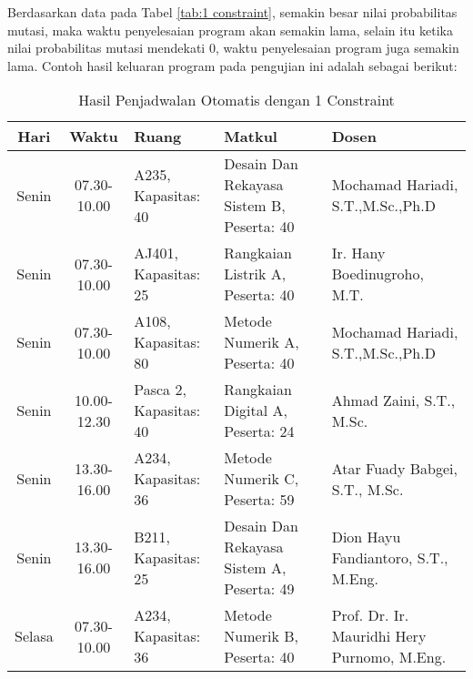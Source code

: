   Berdasarkan data pada Tabel \ref{tab:1 constraint}, semakin besar nilai probabilitas mutasi, maka waktu penyelesaian program akan semakin lama, selain itu ketika nilai probabilitas mutasi mendekati 0, waktu penyelesaian program juga semakin lama.
  Contoh hasil keluaran program pada pengujian ini adalah sebagai berikut:
  \begin{longtable}[c]{|c|c|>{\centering\arraybackslash}m{2.5cm}|>{\centering\arraybackslash}m{4cm}|>{\centering\arraybackslash}m{3.2cm}|}
    \caption{Hasil Penjadwalan Otomatis dengan 1 Constraint}
    \label{tab:1}\\
    \hline
    \rowcolor[HTML]{C0C0C0} 
    Hari   & Waktu       & Ruang                  & Matkul                                                              & Dosen                                         \\ \hline
    Senin  & 07.30-10.00 & A235, Kapasitas: 40    & Desain Dan Rekayasa Sistem B, \linebreak Peserta: 40                & Mochamad Hariadi, S.T.,M.Sc.,Ph.D             \\ \hline
    Senin  & 07.30-10.00 & AJ401, Kapasitas: 25   & Rangkaian Listrik A, \linebreak Peserta: 40                         & Ir. Hany Boedinugroho, M.T.                   \\ \hline
    Senin  & 07.30-10.00 & A108, Kapasitas: 80    & Metode Numerik A, \linebreak Peserta: 40                            & Mochamad Hariadi, S.T.,M.Sc.,Ph.D             \\ \hline
    Senin  & 10.00-12.30 & Pasca 2, Kapasitas: 40 & Rangkaian Digital A, \linebreak Peserta: 24                         & Ahmad Zaini, S.T., M.Sc.                      \\ \hline
    Senin  & 13.30-16.00 & A234, Kapasitas: 36    & Metode Numerik C, \linebreak Peserta: 59                            & Atar Fuady Babgei, S.T., M.Sc.                \\ \hline
    Senin  & 13.30-16.00 & B211, Kapasitas: 25    & Desain Dan Rekayasa Sistem A, \linebreak Peserta: 49                & Dion Hayu Fandiantoro, S.T., M.Eng.           \\ \hline
    Selasa & 07.30-10.00 & A234, Kapasitas: 36    & Metode Numerik B, \linebreak Peserta: 40                            & Prof. Dr. Ir. Mauridhi Hery Purnomo, M.Eng.   \\ \hline

\end{longtable}
